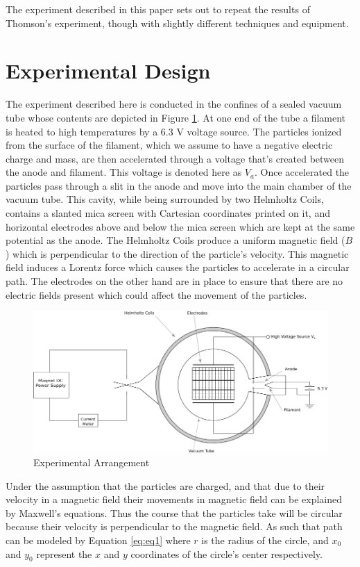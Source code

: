 \documentclass[prb,preprint]{revtex4-1}
\begin{document}
The experiment described in this paper sets out to repeat the results of Thomson's experiment, though with slightly different techniques and equipment.

\newpage

\section{Experimental Design}

The experiment described here is conducted in the confines of a sealed vacuum tube whose contents are depicted in Figure \ref{datafig}. At one end of the tube a filament is heated to high temperatures by a 6.3 V voltage source. The particles ionized from the surface of the filament, which we assume to have a negative electric charge and mass, are then accelerated through a voltage that's created between the anode and filament. This voltage is denoted here as $V_a$. Once accelerated the particles pass through a slit in the anode and move into the main chamber of the vacuum tube. This cavity, while being surrounded by two Helmholtz Coils, contains a slanted mica screen with Cartesian coordinates printed on it, and horizontal electrodes above and below the mica screen which are kept at the same potential as the anode. The Helmholtz Coils produce a uniform magnetic field ($B$) which is perpendicular to the direction of the particle's velocity. This magnetic field induces a Lorentz force which causes the particles to accelerate in a circular path. The electrodes on the other hand are in place to ensure that there are no electric fields present which could affect the movement of the particles.

	\begin{figure}[h]
		\includegraphics[width=.8\textwidth]{ExpFigure.png}
		\caption{Experimental Arrangement}
		\label{datafig}
	\end{figure}

Under the assumption that the particles are charged, and that due to their velocity in a magnetic field their movements in magnetic field can be explained by Maxwell's equations. Thus the course that the particles take will be circular because their velocity is perpendicular to the magnetic field. As such that path can be modeled by Equation \eqref{eq:eq1} where $r$ is the radius of the circle, and $x_0$ and $y_0$ represent the $x$ and $y$ coordinates of the circle's center respectively.
\end{document}
